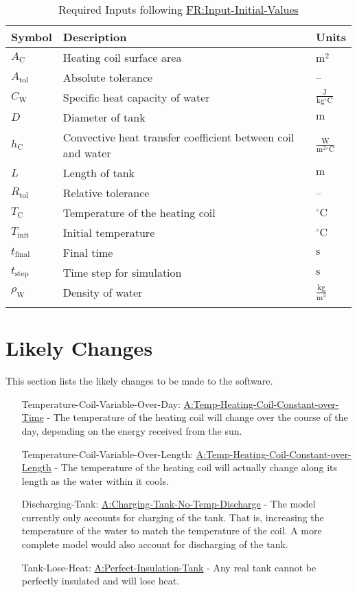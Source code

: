 \documentclass[12pt]{article}
\begin{document}
\begin{longtabu}{l X[l] l}
\toprule
\textbf{Symbol} & \textbf{Description} & \textbf{Units}
\\
\midrule
\endhead
${A_{\text{C}}}$ & Heating coil surface area & ${\text{m}^{2}}$
\\
${A_{\text{tol}}}$ & Absolute tolerance & --
\\
${C_{\text{W}}}$ & Specific heat capacity of water & $\frac{\text{J}}{\text{kg}{}^{\circ}\text{C}}$
\\
$D$ & Diameter of tank & ${\text{m}}$
\\
${h_{\text{C}}}$ & Convective heat transfer coefficient between coil and water & $\frac{\text{W}}{\text{m}^{2}{}^{\circ}\text{C}}$
\\
$L$ & Length of tank & ${\text{m}}$
\\
${R_{\text{tol}}}$ & Relative tolerance & --
\\
${T_{\text{C}}}$ & Temperature of the heating coil & ${{}^{\circ}\text{C}}$
\\
${T_{\text{init}}}$ & Initial temperature & ${{}^{\circ}\text{C}}$
\\
${t_{\text{final}}}$ & Final time & ${\text{s}}$
\\
${t_{\text{step}}}$ & Time step for simulation & ${\text{s}}$
\\
${ρ_{\text{W}}}$ & Density of water & $\frac{\text{kg}}{\text{m}^{3}}$
\\
\bottomrule
\caption{Required Inputs following \hyperref[inputInitVals]{FR:Input-Initial-Values}}
\label{Table:ReqInputs}
\end{longtabu}

\section{Likely Changes}
\label{Sec:LCs}
This section lists the likely changes to be made to the software.

\begin{itemize}
\item[Temperature-Coil-Variable-Over-Day:\phantomsection\label{likeChgTCVOD}]{\hyperref[assumpTHCCoT]{A:Temp-Heating-Coil-Constant-over-Time} - The temperature of the heating coil will change over the course of the day, depending on the energy received from the sun.}
\item[Temperature-Coil-Variable-Over-Length:\phantomsection\label{likeChgTCVOL}]{\hyperref[assumpTHCCoL]{A:Temp-Heating-Coil-Constant-over-Length} - The temperature of the heating coil will actually change along its length as the water within it cools.}
\item[Discharging-Tank:\phantomsection\label{likeChgDT}]{\hyperref[assumpCTNTD]{A:Charging-Tank-No-Temp-Discharge} - The model currently only accounts for charging of the tank. That is, increasing the temperature of the water to match the temperature of the coil. A more complete model would also account for discharging of the tank.}
\item[Tank-Lose-Heat:\phantomsection\label{likeChgTLH}]{\hyperref[assumpPIT]{A:Perfect-Insulation-Tank} - Any real tank cannot be perfectly insulated and will lose heat.}
\end{itemize}
\end{document}
